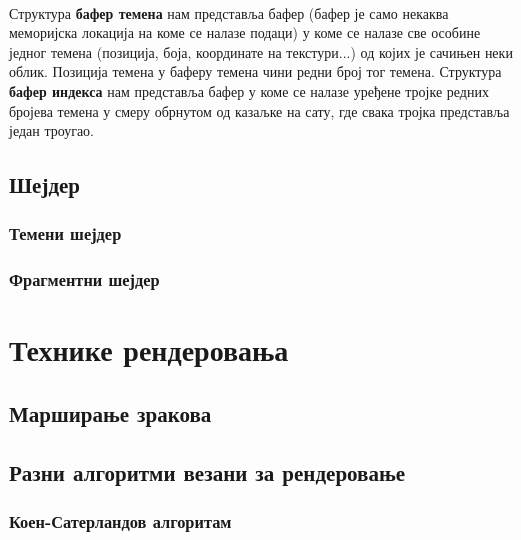 \documentclass[12pt]{article}
\begin{document}
	\paragraph{}
	Структура \textbf{бафер темена} нам представља бафер (бафер је само некаква меморијска локација на коме се налазе подаци) у коме се налазе све особине једног темена (позиција, боја, координате на текстури...) од којих је сачињен неки облик. Позиција темена у баферу темена чини редни број тог темена. Структура \textbf{бафер индекса} нам представља бафер у коме се налазе уређене тројке редних бројева темена у смеру обрнутом од казаљке на сату, где свака тројка представља један троугао.
	
	\subsection{Шејдер}
	
	\subsubsection{Темени шејдер}
		
	\subsubsection{Фрагментни шејдер}
	
	\section{Технике рендеровања}
	
	\subsection{Марширање зракова}\label{sfericnorenderovanje}
	
	\subsection{Разни алгоритми везани за рендеровање}
	
	\subsubsection{Коен-Сатерландов алгоритам}\label{koensaterland}
\end{document}
